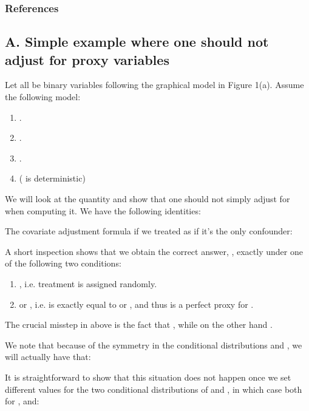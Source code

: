 \documentclass{article}
\begin{document}
\subsubsection*{References}
\begingroup
\renewcommand{\section}[2]{}{\small{

}}
\endgroup
\appendix
 \section*{Appendix}
 \subsection*{A. Simple example where one should not adjust for proxy variables}\label{appsec:simp}

Let  all be binary variables following the graphical model in Figure 1(a).
Assume the following model:
\begin{enumerate}
\item .
\item .
\item .
\item  ( is deterministic)
\end{enumerate}
We will look at the quantity  and show that one should not simply adjust for  when computing it. 
We have the following identities:


The covariate adjustment formula if we treated  as if it's the only confounder:


A short inspection shows that we obtain the correct answer, , exactly under one of the following two conditions:
\begin{enumerate}
\item , i.e. treatment is assigned randomly.
\item  or , i.e.  is exactly equal to  or , and thus is a perfect proxy for .
\end{enumerate}


The crucial misstep in  above is the fact that
 , while on the other hand .
 
We note that because of the symmetry in the conditional distributions  and , we will actually have that:

 It is straightforward to show that this situation does not happen once we set different values for the two conditional distributions of  and , in which case both  for , and: 
  
\end{document}
